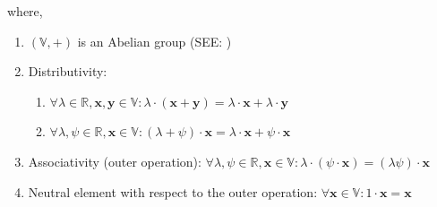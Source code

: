 where,
\begin{enumerate}
    \item $(\mathbb{V}, +)$ is an Abelian group (SEE: )
    \item Distributivity:
    \begin{enumerate}
        \item $\forall \lambda \in \mathbb{R}, \mathbf{x,y}\in \mathbb{V} : \lambda\cdot(\mathbf{x+y}) = \lambda\cdot\mathbf{x} + \lambda\cdot\mathbf{y}$
        
        \item $\forall \lambda,\psi \in \mathbb{R}, \textbf{x}\in \mathbb{V} : (\lambda + \psi) \cdot\textbf{x} = \lambda\cdot\textbf{x} + \psi\cdot\textbf{x}$
        
    \end{enumerate}

    \item Associativity (outer operation): $\forall \lambda,\psi\in\mathbb{R}, \mathbf{x}\in\mathbb{V}: \lambda\cdot(\psi\cdot\mathbf{x}) = (\lambda\psi)\cdot\mathbf{x}$

    \item Neutral element with respect to the outer operation: $\forall \mathbf{x}\in\mathbb{V}:1\cdot\mathbf{x}=\mathbf{x}$
\end{enumerate}
\vspace{0.3cm}


